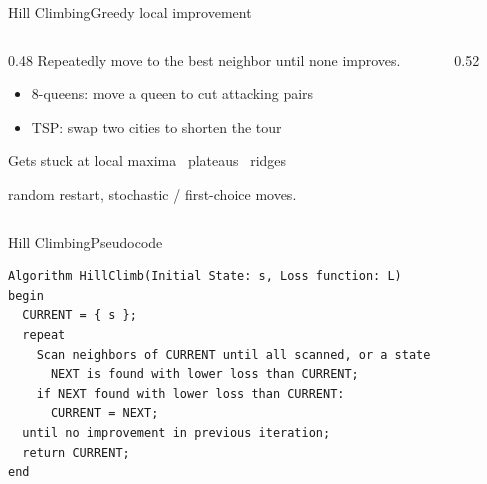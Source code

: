 \documentclass[aspectratio=169,11pt]{beamer}
\begin{document}
\begin{frame}{Hill Climbing}{Greedy local improvement}
  \begin{columns}[T]
    \begin{column}{0.48\textwidth}
      Repeatedly move to the best neighbor until none improves.
      \begin{itemize}\small
        \item 8-queens: move a queen to cut attacking pairs
        \item TSP: swap two cities to shorten the tour
      \end{itemize}
      \begin{alertblock}{Gets stuck at}
        \small local maxima \textbullet\ plateaus \textbullet\ ridges
      \end{alertblock}
      \scriptsize {} random restart, stochastic / first-choice moves.
    \end{column}
    \begin{column}{0.52\textwidth}
      \begin{center}
      \end{center}
    \end{column}
  \end{columns}
\end{frame}

\begin{frame}[fragile]{Hill Climbing}{Pseudocode}
\begin{lstlisting}[language={}, basicstyle=\ttfamily\scriptsize, numbers=none,
                   xleftmargin=0.5em, framexleftmargin=0.5em]
Algorithm HillClimb(Initial State: s, Loss function: L)
begin
  CURRENT = { s };
  repeat
    Scan neighbors of CURRENT until all scanned, or a state
      NEXT is found with lower loss than CURRENT;
    if NEXT found with lower loss than CURRENT:
      CURRENT = NEXT;
  until no improvement in previous iteration;
  return CURRENT;
end
\end{lstlisting}
\end{frame}
\end{document}

